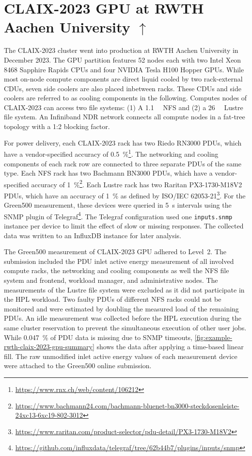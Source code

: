 \section[CLAIX-2023 GPU at RWTH Aachen University]{CLAIX-2023 GPU at RWTH Aachen University \hyperref[tab:examples-overview]{$\uparrow$}}
\label{sec:example-rwth-claix-2023-gpu}

The CLAIX-2023 cluster went into production at RWTH Aachen University in December 2023.
The GPU partition features 52 nodes each with two Intel Xeon 8468 Sapphire Rapids CPUs and four NVIDIA Tesla H100 Hopper GPUs.
While most on-node compute components are direct liquid cooled by two rack-external \acp{CDU}, seven side coolers are also placed inbetween racks.
These \acp{CDU} and side coolers are referred to as cooling components in the following.
Computes nodes of CLAIX-2023 can access two file systems: (1) A \qty{1.1}{\peta\byte} NFS and (2) a \qty{26}{\peta\byte} Lustre file system.
An Infiniband NDR network connects all compute nodes in a fat-tree topology with a 1:2 blocking factor.

For power delivery, each CLAIX-2023 rack has two Riedo RN3000 \acp{PDU}, which have a vendor-specified accuracy of \qty{0.5}{\percent}\footnote{\url{https://www.rnx.ch/web/content/106212}}.
The networking and cooling components of each rack row are connected to three separate \acp{PDU} of the same type.
Each NFS rack has two Bachmann BN3000 \acp{PDU}, which have a vendor-specified accuracy of \qty{1}{\percent}\footnote{\scriptsize\url{https://www.bachmann24.com/bachmann-bluenet-bn3000-steckdosenleiste-24xc13-6xc19-802-3012}}.
Each Lustre rack has two Raritan PX3-1730-M18V2 \acp{PDU}, which have an accuracy of \qty{1}{\percent} as defined by ISO/IEC 62053-21\footnote{\url{https://www.raritan.com/product-selector/pdu-detail/PX3-1730-M18V2}}.
For the Green500 measurement, these devices were queried in \qty{5}{\second} intervals using the \ac{SNMP} plugin of Telegraf\footnote{\url{https://github.com/influxdata/telegraf/tree/62b44b7/plugins/inputs/snmp}}.
The Telegraf configuration used one \texttt{inputs.snmp} instance per device to limit the effect of slow or missing responses.
The collected data was written to an InfluxDB instance for later analysis.

The Green500 measurement of CLAIX-2023 GPU adhered to Level~2.
The submission included the \ac{PDU} inlet active energy measurement of all involved compute racks, the networking and cooling components as well the NFS file system and frontend, workload manager, and administrative nodes.
The measurements of the Lustre file system were excluded as it did not participate in the \acs{HPL} workload.
Two faulty \acp{PDU} of different NFS racks could not be monitored and were estimated by doubling the measured load of the remaining \acp{PDU}.
An idle measurement was collected before the HPL execution during the same cluster reservation to prevent the simultaneous execution of other user jobs.
While \qty{0.047}{\percent} of \ac{PDU} data is missing due to \ac{SNMP} timeouts, \cref{fig:example-rwth-claix-2023-gpu-summary} shows the data after applying a time-based linear fill.
The raw unmodified inlet active energy values of each measurement device were attached to the Green500 online submission.

